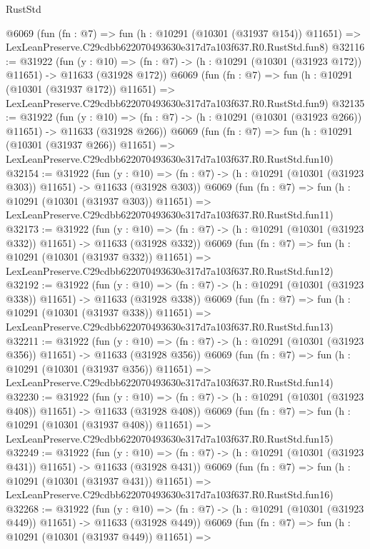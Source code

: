 \begin{lexlean}{RustStd}
\begin{coremodule}
    @6069
    (fun (fn : @7) =>
    fun (h : @10291 (@10301 (@31937 @154)) @11651) =>
    LexLeanPreserve.C29cdbb622070493630e317d7a103f637.R0.RustStd.fun8)
@32116 := @31922
    (fun (y : @10) =>
    (fn : @7) -> (h : @10291 (@10301 (@31923 @172)) @11651) -> @11633 (@31928 @172))
    @6069
    (fun (fn : @7) =>
    fun (h : @10291 (@10301 (@31937 @172)) @11651) =>
    LexLeanPreserve.C29cdbb622070493630e317d7a103f637.R0.RustStd.fun9)
@32135 := @31922
    (fun (y : @10) =>
    (fn : @7) -> (h : @10291 (@10301 (@31923 @266)) @11651) -> @11633 (@31928 @266))
    @6069
    (fun (fn : @7) =>
    fun (h : @10291 (@10301 (@31937 @266)) @11651) =>
    LexLeanPreserve.C29cdbb622070493630e317d7a103f637.R0.RustStd.fun10)
@32154 := @31922
    (fun (y : @10) =>
    (fn : @7) -> (h : @10291 (@10301 (@31923 @303)) @11651) -> @11633 (@31928 @303))
    @6069
    (fun (fn : @7) =>
    fun (h : @10291 (@10301 (@31937 @303)) @11651) =>
    LexLeanPreserve.C29cdbb622070493630e317d7a103f637.R0.RustStd.fun11)
@32173 := @31922
    (fun (y : @10) =>
    (fn : @7) -> (h : @10291 (@10301 (@31923 @332)) @11651) -> @11633 (@31928 @332))
    @6069
    (fun (fn : @7) =>
    fun (h : @10291 (@10301 (@31937 @332)) @11651) =>
    LexLeanPreserve.C29cdbb622070493630e317d7a103f637.R0.RustStd.fun12)
@32192 := @31922
    (fun (y : @10) =>
    (fn : @7) -> (h : @10291 (@10301 (@31923 @338)) @11651) -> @11633 (@31928 @338))
    @6069
    (fun (fn : @7) =>
    fun (h : @10291 (@10301 (@31937 @338)) @11651) =>
    LexLeanPreserve.C29cdbb622070493630e317d7a103f637.R0.RustStd.fun13)
@32211 := @31922
    (fun (y : @10) =>
    (fn : @7) -> (h : @10291 (@10301 (@31923 @356)) @11651) -> @11633 (@31928 @356))
    @6069
    (fun (fn : @7) =>
    fun (h : @10291 (@10301 (@31937 @356)) @11651) =>
    LexLeanPreserve.C29cdbb622070493630e317d7a103f637.R0.RustStd.fun14)
@32230 := @31922
    (fun (y : @10) =>
    (fn : @7) -> (h : @10291 (@10301 (@31923 @408)) @11651) -> @11633 (@31928 @408))
    @6069
    (fun (fn : @7) =>
    fun (h : @10291 (@10301 (@31937 @408)) @11651) =>
    LexLeanPreserve.C29cdbb622070493630e317d7a103f637.R0.RustStd.fun15)
@32249 := @31922
    (fun (y : @10) =>
    (fn : @7) -> (h : @10291 (@10301 (@31923 @431)) @11651) -> @11633 (@31928 @431))
    @6069
    (fun (fn : @7) =>
    fun (h : @10291 (@10301 (@31937 @431)) @11651) =>
    LexLeanPreserve.C29cdbb622070493630e317d7a103f637.R0.RustStd.fun16)
@32268 := @31922
    (fun (y : @10) =>
    (fn : @7) -> (h : @10291 (@10301 (@31923 @449)) @11651) -> @11633 (@31928 @449))
    @6069
    (fun (fn : @7) =>
    fun (h : @10291 (@10301 (@31937 @449)) @11651) =>

\end{coremodule}
\end{lexlean}
